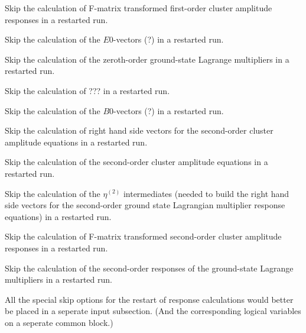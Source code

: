 \begin{description}
   Skip the calculation of F-matrix transformed first-order
   cluster amplitude responses in a restarted run.
%
\item[\Key{E0SKIP}] 
   Skip the calculation of the $E0$-vectors (?)
   in a restarted run.
%
\item[\Key{L0SKIP}]  
   Skip the calculation of the zeroth-order ground-state Lagrange
   multipliers in a restarted run.
%
\item[\Key{LISKIP}] 
   Skip the calculation of ???
   in a restarted run.
%
\item[\Key{B0SKIP}] 
   Skip the calculation of the $B0$-vectors (?)
   in a restarted run.
%
\item[\Key{O2SKIP}] 
   Skip the calculation of right hand side vectors for the 
   second-order cluster amplitude equations
   in a restarted run.
%
\item[\Key{R2SKIP}] 
   Skip the calculation of the 
   second-order cluster amplitude equations
   in a restarted run.
%
\item[\Key{X2SKIP}] 
   Skip the calculation of the $\eta^{(2)}$ intermediates (needed
   to build the right hand side vectors for the second-order 
   ground state Lagrangian multiplier response equations) 
   in a restarted run.
%
\item[\Key{F2SKIP}] 
   Skip the calculation of F-matrix transformed second-order
   cluster amplitude responses in a restarted run.
%
\item[\Key{L2SKIP}]  
   Skip the calculation of the second-order responses of the 
   ground-state Lagrange multipliers in a restarted run.
\end{description}
All the special skip options for the restart of response calculations
would better be placed in a seperate input subsection.
(And the corresponding logical variables on a seperate 
common block.)

